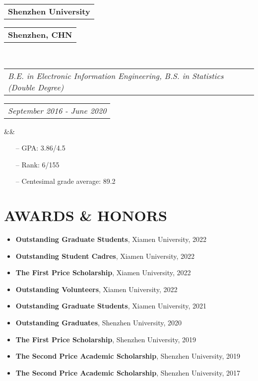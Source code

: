 \documentclass[11pt,a4paper,roman]{moderncv}        %
\makeatletter
\newcommand*{\customcventry}[7][.25em]{
	\begin{tabular}{@{}l} 
		{\bfseries #4}
	\end{tabular}
	\hfill%
	\begin{tabular}{l@{}}
		{\bfseries #5}
	\end{tabular} \\
	\begin{tabular}{@{}l} 
		{\itshape #3}
	\end{tabular}
	\hfill%
	\begin{tabular}{l@{}}
		{\itshape #2}
	\end{tabular}
	\ifx&#7&%
	\else{\\%
		\begin{minipage}{\maincolumnwidth}%
			\small#7%
	\end{minipage}}\fi%
	\par\addvspace{#1}}
\makeatother
\begin{document}
	{\customcventry{September 2016 - June 2020}{B.E. in Electronic Information Engineering, B.S. in Statistics (Double Degree) }{Shenzhen University}{Shenzhen, CHN}{}{}}
	
	\begin{itemize}
		\item[--] GPA: 3.86/4.5 
		\item[--] Rank: 6/155 
		\item[--] Centesimal grade average: 89.2 
	\end{itemize}

	
	\section{AWARDS \& HONORS}
	\begin{minipage}{\maincolumnwidth}%
			\begin{itemize}
				\item \textbf{Outstanding Graduate Students}, Xiamen University, 2022
				\vspace{1mm}
				\item \textbf{Outstanding Student Cadres}, Xiamen University, 2022
				\vspace{1mm}
				\item \textbf{The First Price Scholarship}, Xiamen University, 2022
				\vspace{1mm}
				\item \textbf{Outstanding Volunteers}, Xiamen University, 2022
				\vspace{1mm}
				\item \textbf{Outstanding Graduate Students}, Xiamen University, 2021
				\vspace{1mm}
				\item \textbf{Outstanding Graduates}, Shenzhen University, 2020
				\vspace{1mm}
				\item \textbf{The First Price Scholarship}, Shenzhen University, 2019
				\vspace{1mm}
				\item \textbf{The Second Price Academic Scholarship}, Shenzhen University, 2019
				\vspace{1mm}
				\item \textbf{The Second Price Academic Scholarship}, Shenzhen University, 2017
		\end{itemize}%
	\end{minipage}%
	\vspace*{1.5mm}
	
\end{document}
